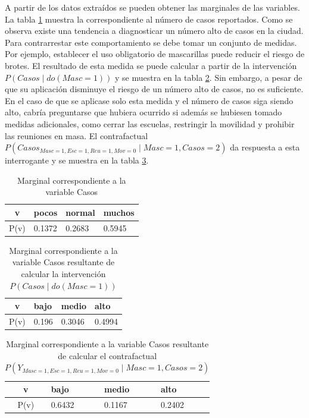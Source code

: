 A partir de los datos extraídos se pueden obtener las marginales de las variables. La tabla \ref{tab:marginals} muestra la correspondiente al número de casos reportados. Como se observa existe una tendencia a diagnosticar un número alto de casos en la ciudad. Para contrarrestar este comportamiento se debe tomar un conjunto de medidas. Por ejemplo, establecer el uso obligatorio de mascarillas puede reducir el riesgo de brotes. El resultado de esta medida se puede calcular a partir de la intervención $P(Casos \mid do(Masc=1))$ y se muestra en la tabla \ref{tab:int}. Sin embargo, a pesar de que su aplicación disminuye el riesgo de un número alto de casos,  no es suficiente. En el caso de que se aplicase solo esta medida y el número de casos siga siendo alto, cabría preguntarse que hubiera ocurrido si además se hubiesen tomado medidas adicionales, como cerrar las escuelas, restringir la movilidad y prohibir las reuniones en masa. El contrafactual $P(Casos_{Masc=1, Esc=1, Reu=1, Mov=0} \mid Masc=1, Casos=2)$ da respuesta a esta interrogante y se muestra en la tabla \ref{tab:count}.

\begin{table}[h!]
	\centering
	\begin{tabular}{| c | m{1.2cm} | m{1.2cm}| m{1.2cm} |}
		\hline
		v & pocos & normal & muchos \\
		\hline
		P(v) & 0.1372 & 0.2683 & 0.5945 \\
		\hline
	\end{tabular}
	\caption{Marginal correspondiente a la variable Casos}
	\label{tab:marginals}
\end{table}

\begin{table}[h!]
	\centering
	\begin{tabular}{| c | m{1cm} | m{1cm}| m{1cm} |}
		\hline
		v & bajo & medio & alto \\
		\hline
		P(v) & 0.196 & 0.3046 & 0.4994 \\
		\hline
	\end{tabular}
	\caption{Marginal correspondiente a la variable Casos resultante de calcular la intervención $P(Casos \mid do(Masc=1))$}
	\label{tab:int}
\end{table}

\begin{table}[h!]
	\centering
	\begin{tabular}{| c | m{1cm} | m{1cm}| m{1cm} |}
		\hline
		v & bajo & medio & alto \\
		\hline
		P(v) & 0.6432 & 0.1167 & 0.2402 \\
		\hline
	\end{tabular}
	\caption{Marginal correspondiente a la variable Casos resultante de calcular el contrafactual $P(Y_{Masc=1, Esc=1, Reu=1, Mov=0} \mid Masc=1,Casos=2)$}
	\label{tab:count}
\end{table}

